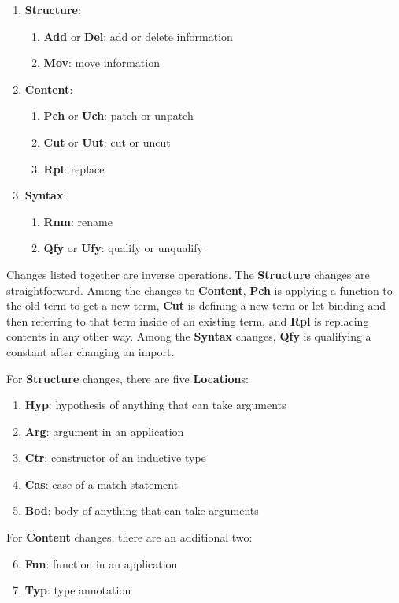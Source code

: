\begin{enumerate}
\item \textbf{Structure}:
\begin{enumerate}
\item \textbf{Add} or \textbf{Del}: add or delete information
\item \textbf{Mov}: move information
\end{enumerate}
\item \textbf{Content}:
\begin{enumerate}
\item \textbf{Pch} or \textbf{Uch}: patch or unpatch
\item \textbf{Cut} or \textbf{Uut}: cut or uncut
\item \textbf{Rpl}: replace
\end{enumerate}
\item \textbf{Syntax}:
\begin{enumerate}
\item \textbf{Rnm}: rename
\item \textbf{Qfy} or \textbf{Ufy}: qualify or unqualify
\end{enumerate}
\end{enumerate}
Changes listed together are inverse operations.
The \textbf{Structure} changes are straightforward.
Among the changes to \textbf{Content}, \textbf{Pch} is applying a function
to the old term to get a new term, \textbf{Cut} is defining a new term
or let-binding and then referring to that term inside of an existing term,
and \textbf{Rpl} is replacing contents in any other way.
Among the \textbf{Syntax} changes, \textbf{Qfy} is
qualifying a constant after changing an import.

For \textbf{Structure} changes, there are five \textbf{Location}s:

\begin{enumerate}
\item \textbf{Hyp}: hypothesis of anything that can take arguments
\item \textbf{Arg}: argument in an application
\item \textbf{Ctr}: constructor of an inductive type
\item \textbf{Cas}: case of a match statement
\item \textbf{Bod}: body of anything that can take arguments
\end{enumerate}

For \textbf{Content} changes, there are an additional two:

\begin{enumerate}
\setcounter{enumi}{5}
\item \textbf{Fun}: function in an application
\item \textbf{Typ}: type annotation
\end{enumerate}

